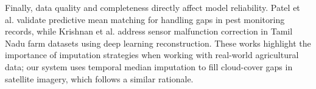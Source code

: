 Finally, data quality and completeness directly affect model reliability. Patel et al. \cite{patel2024imputation} validate predictive mean matching for handling gaps in pest monitoring records, while Krishnan et al. \cite{krishnan2023reconstruction} address sensor malfunction correction in Tamil Nadu farm datasets using deep learning reconstruction. These works highlight the importance of imputation strategies when working with real-world agricultural data; our system uses temporal median imputation to fill cloud-cover gaps in satellite imagery, which follows a similar rationale.

